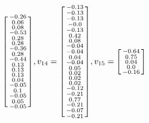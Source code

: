 \documentclass[a4paper,hidelinks,14pt]{extarticle}
\begin{document}
$$\begin{bsmallmatrix}
		-0.26\\     
		0.06\\     
		0.08\\     
		-0.53\\     
		0.28\\  
		0.28\\     
		-0.36\\     
		0.28\\   
		-0.44\\    
		0.13\\   
		0.13\\    
		0.13\\   
		0.04\\   
		-0.05\\   
		0.1\\      
		-0.05\\  
		0.05\\   
		-0.05\\ 
	\end{bsmallmatrix},
	v_{14}=\begin{bsmallmatrix}
		   -0.13\\    
		-0.13\\    
		-0.13\\     
		-0.0\\     
		-0.13\\    
		0.42\\     
		0.08\\     
		-0.04\\ 
		-0.04\\    
		0.04\\     
		-0.04\\  
		0.05\\    
		0.02\\   
		0.02\\    
		0.02\\   
		-0.12\\  
		-0.21\\  
		0.77\\      
		-0.21\\ 
		-0.07\\  
		-0.21\\
	\end{bsmallmatrix},
	v_{15}=\begin{bsmallmatrix}
		      -0.64\\   
		   0.75\\    
		   0.04\\     
		   0.0\\      
		   -0.16\\   

\end{bsmallmatrix}$$
\end{document}
